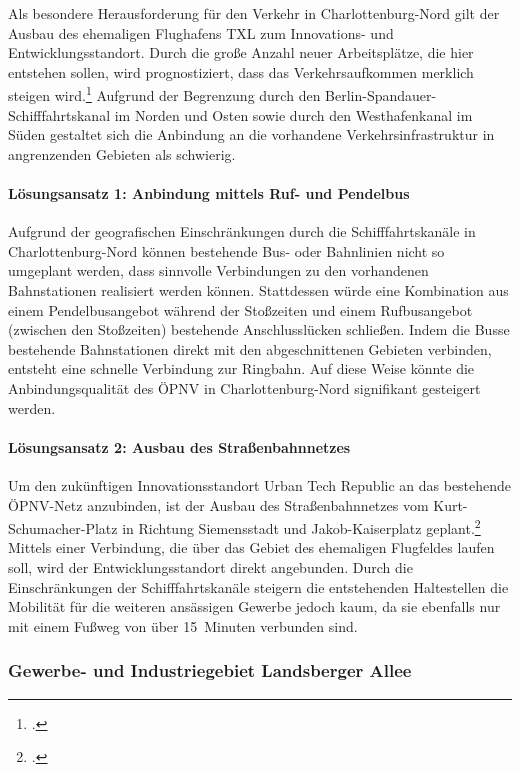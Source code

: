Als besondere Herausforderung für den Verkehr in Charlottenburg-Nord gilt der Ausbau des ehemaligen Flughafens TXL zum Innovations- und Entwicklungsstandort. Durch die große Anzahl neuer Arbeitsplätze, die hier entstehen sollen, wird prognostiziert, dass das Verkehrsaufkommen merklich steigen wird.\footcite{UrbanTechRepublic} Aufgrund der Begrenzung durch den Berlin-Spandauer-Schifffahrtskanal im Norden und Osten sowie durch den Westhafenkanal im Süden gestaltet sich die Anbindung an die vorhandene Verkehrsinfrastruktur in angrenzenden Gebieten als schwierig.

\paragraph{Lösungsansatz 1: Anbindung mittels Ruf- und Pendelbus}
Aufgrund der geografischen Einschränkungen durch die Schifffahrtskanäle in Charlottenburg-Nord können bestehende Bus- oder Bahnlinien nicht so umgeplant werden, dass sinnvolle Verbindungen zu den vorhandenen Bahnstationen realisiert werden können. Stattdessen würde eine Kombination aus einem Pendelbusangebot während der Stoßzeiten und einem Rufbusangebot (zwischen den Stoßzeiten) bestehende Anschlusslücken schließen. Indem die Busse bestehende Bahnstationen direkt mit den abgeschnittenen Gebieten verbinden, entsteht eine schnelle Verbindung zur Ringbahn. Auf diese Weise könnte die Anbindungsqualität des ÖPNV in Charlottenburg-Nord signifikant gesteigert werden.

\paragraph{Lösungsansatz 2: Ausbau des Straßenbahnnetzes}
Um den zukünftigen Innovationsstandort Urban Tech Republic an das bestehende ÖPNV-Netz anzubinden, ist der Ausbau des Straßenbahnnetzes vom Kurt-Schumacher-Platz in Richtung Siemensstadt und Jakob-Kaiserplatz geplant.\footcite{NahverkehrsplanBerlin} Mittels einer Verbindung, die über das Gebiet des ehemaligen Flugfeldes laufen soll, wird der Entwicklungsstandort direkt angebunden. Durch die Einschränkungen der Schifffahrtskanäle steigern die entstehenden Haltestellen die Mobilität für die weiteren ansässigen Gewerbe jedoch kaum, da sie ebenfalls nur mit einem Fußweg von über 15~Minuten verbunden sind.

\subsubsection{Gewerbe- und Industriegebiet Landsberger Allee}
